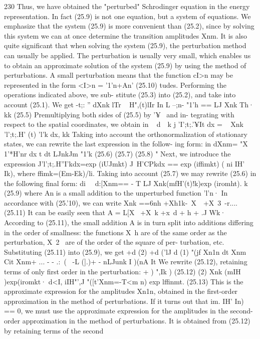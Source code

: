 \documentclass[a4paper,sfsidenotes,colorlinks=true]{tufte-book}
\numberwithin{equation}{section}
\numberwithin{figure}{section}
\begin{document}
{{{{{{230
Thus, we have obtained the "perturbed" Schrodinger equation in the energy representation. In fact (25.9) is not one equation, but a system of equations. We emphasize that the system (25.9) is more convenient than (25.2), since by solving this system we can at once determine the transition amplitudes Xnm. It is also quite significant that when solving the system (25.9), the perturbation method can usually be applied.
The perturbation is usually very small, which enables us to obtain an approximate solution of the system (25.9) by using the method of perturbations. A small perturbation means that the function cI>n may be represented in the form
<I>n = '1'n+An'	(25.10)
tudes. Performing the operations indicated above, we sub- stitute (25.3) into (25.2), and take into account (25.1). We get
-t;: '' dXnk lTr	~	H",(t)lIr In L --;n- "1'h == LJ Xnk	Th·
kk
(25.5)
Premultiplying both sides of (25.5) by '¥~ and in- tegrating with respect to the spatial coordinates, we obtain
in ~ d~~k j 'I';t;.'¥It dx = ~ Xnk ~ 'l';t;.H' (t) 'l'k dx, kk
Taking into account the orthonormalization of stationary states, we can rewrite the last expression in the follow- ing form:
in dXnm= "X 1'*H'nr dx t dt LJnkJm "1'k 
(25.6)
(25.7)
(25.8)
"
Next, we introduce the expression
J'l';t;.H''I'kdx=exp (iUJmkt) J~H'CPkdx == exp (iffimkt) ( ni IH' Ik),
where
ffimk=(Em-Ek)/li.
Taking into account (25.7) we may rewrite (25.6) in the following final form:
di~~ d:[Xnm== - T LJ Xnk(mfH'(t)!k)exp (iromht).
k
(25.9)
where An is a small addition to the unperturbed function 'l'n· In accordance with (25.'10), we can write
Xnk ==6nh +Xh1k-~X~~+X~3~-r....	(25.11) It can be easily seen that A = L[X~ +X~k +x~d +
h +	.J Wk· According to (25.11), the small addition A
is in turn split into additions differing in the order of smallness: the functions X~h are of the same order as the perturbation, X~2~	are of the order of the square of per- turbation, etc. Substituting (25.11) into (25.9), we get
+d	(2)	+d	('lJ
d (1) "(jf Xn1n	dt Xnm	Cit Xnm+ ...
- - .:~(~ -L (].)+ -	nLJunk I	)(nA
It
We rewrite (25.12), retaining terms of only first order in the perturbation:
+ ) ",Ik	) (25.12)
(2) Xnk	 (mIH	)exp(iromkt·
d<I, iIH"',J "([t'Xnm=-T<m	n) exp lffinmt.	(25.13)
This is the approximate expression for the amplitudes Xn1n, obtained in the first-order approximation in the
method of perturbations.
If it turns out that im. IH' In) == 0, we must use the approximate expression for the amplitudes in the second- order approximation in the method of perturbations. It is obtained from (25.12) by retaining terms of the second
}}}}}}
\end{document}
